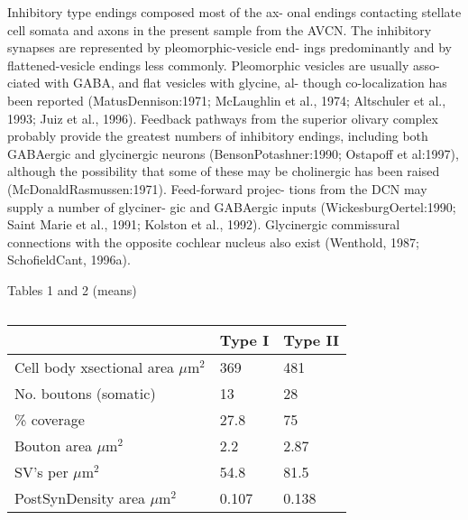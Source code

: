 \documentclass[10pt,a4paper]{article}
\newcommand{\umsq}{$\mu$m$^2$}
\begin{document}
\textsf{Inhibitory type endings composed most of the ax- onal endings contacting
  stellate cell somata and axons in the present sample from the AVCN. The
  inhibitory synapses are represented by pleomorphic-vesicle end- ings
  predominantly and by flattened-vesicle endings less commonly. Pleomorphic
  vesicles are usually asso- ciated with GABA, and flat vesicles with glycine,
  al- though co-localization has been reported (MatusDennison:1971; McLaughlin
  et al., 1974; Altschuler et al., 1993; Juiz et al., 1996). Feedback pathways
  from the superior olivary complex probably provide the greatest numbers of
  inhibitory endings, including both GABAergic and glycinergic neurons
  (BensonPotashner:1990; Ostapoff et al:1997), although the possibility that
  some of these may be cholinergic has been raised
  (McDonaldRasmussen:1971). Feed-forward projec- tions from the DCN may supply a
  number of glyciner- gic and GABAergic inputs (WickesburgOertel:1990; Saint
  Marie et al., 1991; Kolston et al., 1992). Glycinergic commissural connections
  with the opposite cochlear nucleus also exist (Wenthold, 1987; SchofieldCant,
  1996a).}







\citep{ReddCahillEtAl:2002} Tables 1 and 2 (means)

\begin{table}[h]
\caption{\citep[Table 1 in ][]{ReddCahillEtAl:2002}}

  \begin{tabularx}{\textwidth}{XXX}
\toprule
                                & Type I & Type II\\\midrule
Cell body xsectional area \umsq &  369   & 481\\ 
     No. boutons (somatic)      &  13   & 28\\   
          \% coverage           &  27.8  & 75\\  
       Bouton area \umsq        &  2.2   & 2.87\\
SV{\textquoteright}s per \umsq  &  54.8  & 81.5\\
   PostSynDensity area \umsq    & 0.107  & 0.138\\
\bottomrule
\end{tabularx}
\end{table}
\end{document}
